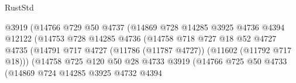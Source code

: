 \begin{lexlean}{RustStd}
\begin{coremodule}
                                            @3919
                                            (@14766
                                              @729
                                              @50
                                              @4737
                                              (@14869
                                                @728
                                                @14285
                                                @3925
                                                @4736
                                                @4394
                                                @12122
                                                (@14753
                                                  @728
                                                  @14285
                                                  @4736
                                                  (@14758
                                                    @718
                                                    @727
                                                    @18
                                                    @52
                                                    @4727
                                                    @4735
                                                    (@14791
                                                      @717
                                                      @4727
                                                      (@11786 (@11787 @4727))
                                                      (@11602 (@11792 @717 @18)))
                                                    (@14758
                                                      @725
                                                      @120
                                                      @50
                                                      @28
                                                      @4733
                                                      @3919
                                                      (@14766
                                                        @725
                                                        @50
                                                        @4733
                                                        (@14869
                                                          @724
                                                          @14285
                                                          @3925
                                                          @4732
                                                          @4394

\end{coremodule}
\end{lexlean}
